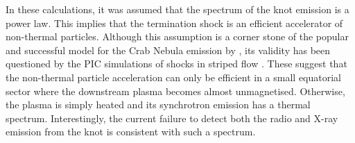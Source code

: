 In these calculations, it was assumed that the spectrum of the knot emission is a power law. This implies that the termination shock is an efficient accelerator of non-thermal particles. Although this assumption is a corner stone of the popular and successful model for the Crab Nebula emission by \citet{kc84b}, its validity has been questioned by the PIC simulations of shocks in striped flow \citep{SS-11}. These suggest that the non-thermal particle acceleration can only be efficient in a small equatorial sector where the downstream plasma becomes almost unmagnetised.  Otherwise, the plasma is simply heated and its synchrotron emission has a thermal spectrum.  Interestingly, the current failure to detect both the radio and X-ray emission from the knot  is consistent with such a spectrum.      
